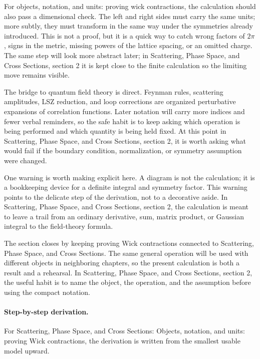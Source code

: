For objects, notation, and units: proving wick contractions, the calculation should also pass a dimensional check.  The left and right sides must carry the same units; more subtly, they must transform in the same way under the symmetries already introduced.  This is not a proof, but it is a quick way to catch wrong factors of \(2\pi\), signs in the metric, missing powers of the lattice spacing, or an omitted charge.  The same step will look more abstract later; in Scattering, Phase Space, and Cross Sections, section 2 it is kept close to the finite calculation so the limiting move remains visible.

The bridge to quantum field theory is direct.  Feynman rules, scattering amplitudes, LSZ reduction, and loop corrections are organized perturbative expansions of correlation functions.  Later notation will carry more indices and fewer verbal reminders, so the safe habit is to keep asking which operation is being performed and which quantity is being held fixed.  At this point in Scattering, Phase Space, and Cross Sections, section 2, it is worth asking what would fail if the boundary condition, normalization, or symmetry assumption were changed.

One warning is worth making explicit here.  A diagram is not the calculation; it is a bookkeeping device for a definite integral and symmetry factor.  This warning points to the delicate step of the derivation, not to a decorative aside.  In Scattering, Phase Space, and Cross Sections, section 2, the calculation is meant to leave a trail from an ordinary derivative, sum, matrix product, or Gaussian integral to the field-theory formula.

The section closes by keeping proving Wick contractions connected to Scattering, Phase Space, and Cross Sections.  The same general operation will be used with different objects in neighboring chapters, so the present calculation is both a result and a rehearsal.  In Scattering, Phase Space, and Cross Sections, section 2, the useful habit is to name the object, the operation, and the assumption before using the compact notation.



\paragraph{Step-by-step derivation.}

For Scattering, Phase Space, and Cross Sections: Objects, notation, and units: proving Wick contractions, the derivation is written from the smallest usable model upward.

